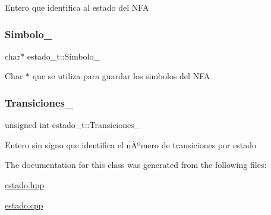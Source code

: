 Entero que identifica al estado del N\+FA \mbox{\label{classestado__t_af9afe7e6634f65b6e5e664810d5941d1}} 
\subsubsection{\texorpdfstring{Simbolo\+\_\+}{Simbolo\_}}
{\footnotesize\ttfamily char$\ast$ estado\+\_\+t\+::\+Simbolo\+\_\+}

Char $\ast$ que se utiliza para guardar los simbolos del N\+FA \mbox{\label{classestado__t_af3db2b51130263e7a94d36018303bb48}} 
\subsubsection{\texorpdfstring{Transiciones\+\_\+}{Transiciones\_}}
{\footnotesize\ttfamily unsigned int estado\+\_\+t\+::\+Transiciones\+\_\+}

Entero sin signo que identifica el nÃºmero de transiciones por estado 

The documentation for this class was generated from the following files\+:\begin{DoxyCompactItemize}
\item 
\hyperlink{estado_8hpp}{estado.\+hpp}\item 
\hyperlink{estado_8cpp}{estado.\+cpp}\end{DoxyCompactItemize}
